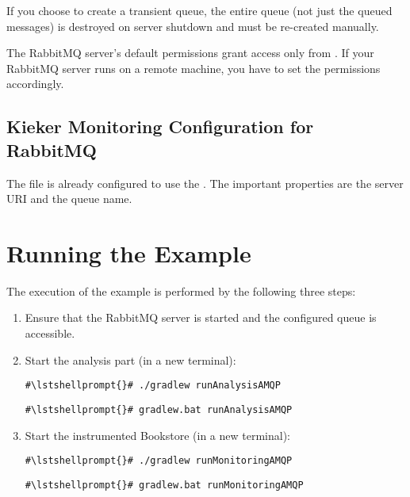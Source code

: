 \begin{compactenum}
 \item If you choose to create a transient queue, the entire queue (not just the queued messages) is destroyed %
 on server shutdown and must be re-created manually. %
 \item The RabbitMQ server's default permissions grant access only from . If your RabbitMQ server runs %
 on a remote machine, you have to set the permissions accordingly. %
\end{compactenum}

\subsection{Kieker Monitoring Configuration for RabbitMQ}
The file  %
is already configured to use the . The important properties are %
the server URI and the queue name. %

\setPropertiesListing


\setPropertiesListing


\section{Running the Example}
The execution of the example is performed by the following three steps:
\begin{enumerate}
\item Ensure that the RabbitMQ server is started and the configured queue is accessible.

\item Start the analysis part (in a new terminal):
\setBashListing
\begin{lstlisting}[caption=Start the analysis part under UNIX-like systems]
#\lstshellprompt{}# ./gradlew runAnalysisAMQP
\end{lstlisting}
\begin{lstlisting}[caption=Start the analysis part under Windows]
#\lstshellprompt{}# gradlew.bat runAnalysisAMQP
\end{lstlisting}
\item Start the instrumented Bookstore (in a new terminal):
\setBashListing
\begin{lstlisting}[caption=Start the analysis part under UNIX-like systems]
#\lstshellprompt{}# ./gradlew runMonitoringAMQP
\end{lstlisting}
\begin{lstlisting}[caption=Start the analysis part under Windows]
#\lstshellprompt{}# gradlew.bat runMonitoringAMQP
\end{lstlisting}
\end{enumerate}